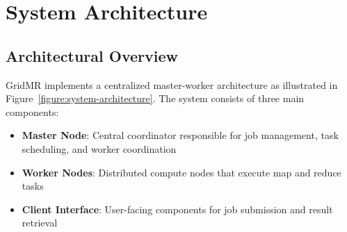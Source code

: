\documentclass[11pt,letterpaper,oneside]{article}
\begin{document}

\section{System Architecture}

\subsection{Architectural Overview}

GridMR implements a centralized master-worker architecture as illustrated in Figure~\ref{figure:system-architecture}. The system consists of three main components:

\begin{itemize}
    \item \textbf{Master Node}: Central coordinator responsible for job management, task scheduling, and worker coordination
    \item \textbf{Worker Nodes}: Distributed compute nodes that execute map and reduce tasks
    \item \textbf{Client Interface}: User-facing components for job submission and result retrieval
\end{itemize}
\end{document}
